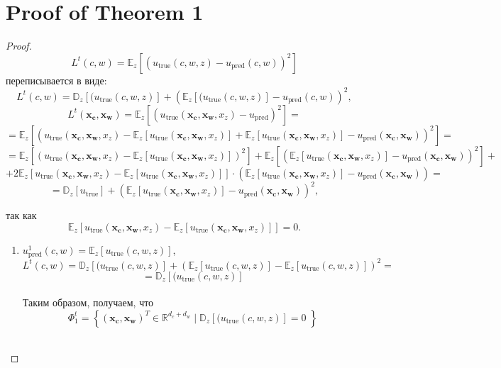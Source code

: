 \documentclass{article}
\begin{document}
        \section{Proof of Theorem 1} 
    \begin{proof}

        $$L^t(c, w) = \mathbb{E}_z[(u_{\text{true}}(c, w, z) - u_{\text{pred}}(c, w))^2]$$ переписывается в виде:
        $$L^t(c, w) = \mathbb{D}_z[(u_{\text{true}}(c, w, z)] + \left(\mathbb{E}_z[(u_{\text{true}}(c, w, z)] - u_{\text{pred}}(c, w)\right)^2,$$ 
            $$L^t(\mathbf{x_c}, \mathbf{x_w}) = \mathbb{E}_z \left[(u_{\text{true}}(\mathbf{x_c}, \mathbf{x_w}, x_z)-u_{\text{pred}})^2 \right] =  $$ 
            $$ = \mathbb{E}_z \left[(u_{\text{true}}(\mathbf{x_c}, \mathbf{x_w}, x_z) -  \mathbb{E}_z \left[  u_{\text{true}}(\mathbf{x_c}, \mathbf{x_w}, x_z) \right] + \mathbb{E}_z \left[ u_{\text{true}}(\mathbf{x_c}, \mathbf{x_w}, x_z) \right] - u_{\text{pred}}(\mathbf{x_c}, \mathbf{x_w}))^2 \right] = $$ 
            $$ = \mathbb{E}_z \left[(u_{\text{true}}(\mathbf{x_c}, \mathbf{x_w}, x_z) -  \mathbb{E}_z \left[  u_{\text{true}}(\mathbf{x_c}, \mathbf{x_w}, x_z) \right])^2\right] + \mathbb{E}_z \left[( \mathbb{E}_z \left[  u_{\text{true}}(\mathbf{x_c}, \mathbf{x_w}, x_z) \right] -  u_{\text{pred}}(\mathbf{x_c}, \mathbf{x_w}))^2\right]  + $$ 
            $$ + 2\mathbb{E}_z \left[u_{\text{true}}(\mathbf{x_c}, \mathbf{x_w}, x_z)
            - \mathbb{E}_z \left[  u_{\text{true}}(\mathbf{x_c}, \mathbf{x_w}, x_z) \right]\right] \cdot  (\mathbb{E}_z \left[ u_{\text{true}}(\mathbf{x_c}, \mathbf{x_w}, x_z) \right] - u_{\text{pred}}(\mathbf{x_c}, \mathbf{x_w})) = $$ $$ = \mathbb{D}_z \left[ u_{\text{true}}\right] + ( \mathbb{E}_z \left[  u_{\text{true}}(\mathbf{x_c}, \mathbf{x_w}, x_z) \right] -  u_{\text{pred}}(\mathbf{x_c}, \mathbf{x_w}))^2 , $$
        
        так как 
        $$\mathbb{E}_z \left[u_{\text{true}}(\mathbf{x_c}, \mathbf{x_w}, x_z) -  \mathbb{E}_z \left[  u_{\text{true}}(\mathbf{x_c}, \mathbf{x_w}, x_z) \right]\right] = 0. $$

        \begin{enumerate}

            \item $u^1_{\text{pred}}(c, w) = \mathbb{E}_z[u_{\text{true}}(c, w, z)]$, \\
            $$L^t(c, w) = \mathbb{D}_z[(u_{\text{true}}(c, w, z)] + \left(\mathbb{E}_z[u_{\text{true}}(c, w, z)] -  \mathbb{E}_z[u_{\text{true}}(c, w, z)]\right)^2 = $$
            $$ = \mathbb{D}_z[(u_{\text{true}}(c, w, z)]$$\\
            Таким образом, получаем, что
            $$\Phi^t_1 = \left\{ (\mathbf{x_c}, \mathbf{x_w})^T \in \mathbb{R}^{d_c + d_w} \; | \; \mathbb{D}_z[(u_{\text{true}}(c, w, z)]=0 \; \right\}$$\\
                

\end{enumerate}
\end{proof}
\end{document}
